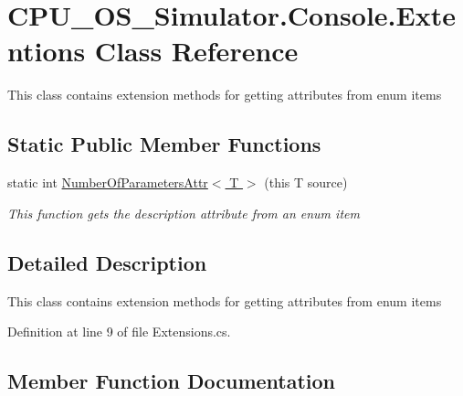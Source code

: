 \hypertarget{class_c_p_u___o_s___simulator_1_1_console_1_1_extentions}{}\section{C\+P\+U\+\_\+\+O\+S\+\_\+\+Simulator.\+Console.\+Extentions Class Reference}
\label{class_c_p_u___o_s___simulator_1_1_console_1_1_extentions}


This class contains extension methods for getting attributes from enum items  


\subsection*{Static Public Member Functions}
\begin{DoxyCompactItemize}
\item 
static int \hyperlink{class_c_p_u___o_s___simulator_1_1_console_1_1_extentions_a3496e569943109589d523e9854148b6c}{Number\+Of\+Parameters\+Attr$<$ T $>$} (this T source)
\begin{DoxyCompactList}\small\item\em This function gets the description attribute from an enum item \end{DoxyCompactList}\end{DoxyCompactItemize}


\subsection{Detailed Description}
This class contains extension methods for getting attributes from enum items 



Definition at line 9 of file Extensions.\+cs.



\subsection{Member Function Documentation}
\hypertarget{class_c_p_u___o_s___simulator_1_1_console_1_1_extentions_a3496e569943109589d523e9854148b6c}{}

